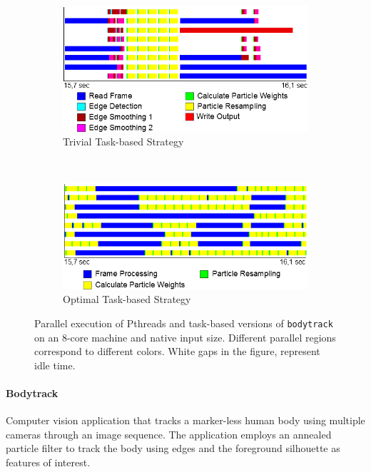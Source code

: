 \begin{figure}[ht!]
	\vspace{1cm}
	\centering
  \begin{subfigure}{0.9\textwidth}
		\includegraphics[width=\textwidth]{task_benchmarks/figures/bodytrack-ompss-native-8-2dp_tasks_pthreads}
		\caption{Trivial Task-based Strategy}
	\label{fig:bodytrack-2dp_tasks-trace_pthreads}
  \end{subfigure}%
\\
\vspace{1cm}
\begin{subfigure}{0.9\textwidth}
		\includegraphics[width=\textwidth]{task_benchmarks/figures/bodytrack-ompss-native-8-2dp_tasks_ompss}
		\caption{Optimal Task-based Strategy}
	\label{fig:bodytrack-2dp_tasks-trace_ompss}
  \end{subfigure}
	\caption{Parallel execution of Pthreads and task-based versions of \texttt{bodytrack} on an 8-core machine and native input size. Different parallel regions correspond to different colors.  White gaps in the figure, represent idle time.}%
	\label{fig:bodytrack-2dp_tasks-trace}%
\end{figure}

\paragraph{\textbf{Bodytrack}}
Computer vision application that tracks a marker-less human body using multiple cameras
through an image sequence.  The application employs an annealed particle filter to track
the body using edges and the foreground silhouette as features of interest.

